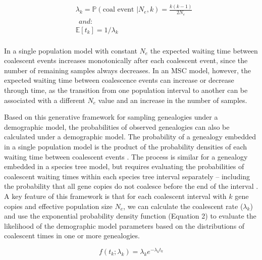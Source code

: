 \documentclass[11pt]{article}
\begin{document}
\begin{equation}
\begin{aligned}
	&\lambda_k = \mathbb{P}(\text{coal~event~} | N_e,k) = \frac{k(k-1)}{2N_e}
	\\
	&~~and:
	\\[0.15cm]
	&\mathbb{E}[t_k] = 1 / \lambda_k
	\\[0.15cm]	
\end{aligned}
\end{equation}

\noindent In a single population model
with constant $N_e$ the expected waiting time between coalescent events 
increases monotonically after each coalescent event, since the number of
remaining samples always decreases. In an MSC model, 
however, the expected waiting time between coalescence events can increase or 
decrease through time, as the transition from one population interval to another 
can be associated with a different $N_e$ value and an increase in the number 
of samples.

Based on this generative framework for sampling genealogies 
under a demographic model, 
the probabilities of observed genealogies can also be calculated under 
a demographic model.
The probability of a genealogy embedded in a single population model is
the product of the probability densities of each waiting time between 
coalescent events \citep{kingman1982coalescent}. 
The process is similar for a genealogy embedded in a species tree model, but
requires evaluating the probabilities of coalescent waiting times within each
species tree interval separately -- 
including the probability that all gene copies do not coalesce before the 
end of the interval \citep{rannala2003bayes}.
A key feature of this framework is that for each coalescent interval 
with $k$ gene copies and effective population size $N_e$, we can 
calculate the coalescent rate ($\lambda_k$) and use the exponential probability
density function (Equation 2) to evaluate the likelihood of the 
demographic model parameters based on the distributions of coalescent 
times in one or more genealogies.
	
\begin{equation}
	f(t_k; \lambda_k) = \lambda_k e^{-\lambda_k t_k}
\end{equation}
\end{document}
